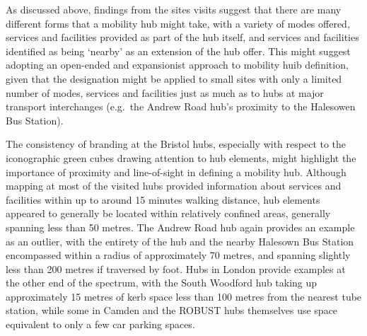 \documentclass[preprint, 3p,
authoryear]{elsarticle} %
\begin{document}
As discussed above, findings from the sites visits suggest that there
are many different forms that a mobility hub might take, with a variety
of modes offered, services and facilities provided as part of the hub
itself, and services and facilities identified as being `nearby' as an
extension of the hub offer. This might suggest adopting an open-ended
and expansionist approach to mobility huib definition, given that the
designation might be applied to small sites with only a limited number
of modes, services and facilities just as much as to hubs at major
transport interchanges (e.g.~the Andrew Road hub's proximity to the
Halesowen Bus Station).

The consistency of branding at the Bristol hubs, especially with respect
to the iconographic green cubes drawing attention to hub elements, might
highlight the importance of proximity and line-of-sight in defining a
mobility hub. Although mapping at most of the visited hubs provided
information about services and facilities within up to around 15 minutes
walking distance, hub elements appeared to generally be located within
relatively confined areas, generally spanning less than 50 metres. The
Andrew Road hub again provides an example as an outlier, with the
entirety of the hub and the nearby Halesown Bus Station encompassed
within a radius of approximately 70 metres, and spanning slightly less
than 200 metres if traversed by foot. Hubs in London provide examples at
the other end of the spectrum, with the South Woodford hub taking up
approximately 15 metres of kerb space less than 100 metres from the
nearest tube station, while some in Camden and the ROBUST hubs
themselves use space equivalent to only a few car parking spaces.
\end{document}
